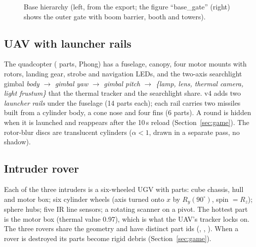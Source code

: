 \begin{figure}[h]
\centering
\begin{minipage}[t]{0.56\linewidth}\vspace{0pt}\end{minipage}\hfill
\begin{minipage}[t]{0.40\linewidth}\vspace{0pt}
\captionsetup{type=figure}
\end{minipage}
\caption{Base hierarchy (left, from the export; the figure ``base\_gate'' (right) shows the outer gate with boom
barrier, booth and towers).}
\end{figure}

\subsection{UAV with launcher rails}
The quadcopter (\partsUav{} parts, Phong) has a fuselage, canopy, four motor mounts with rotors, landing gear, strobe and
navigation LEDs, and the two-axis searchlight gimbal
\emph{body $\to$ gimbal yaw $\to$ gimbal pitch $\to$ \{lamp, lens, thermal camera, light frustum\}} that the thermal
tracker and the searchlight share. v4 adds two \emph{launcher rails} under the fuselage (14 parts each); each rail
carries two missiles built from a cylinder body, a cone nose and four fins (6 parts). A round is hidden when it is launched and
reappears after the 10\,s reload (Section~\ref{sec:game}). The rotor-blur discs are translucent cylinders
($\alpha<1$, drawn in a separate pass, no shadow).


\subsection{Intruder rover}
Each of the three intruders is a six-wheeled UGV with \partsRover{} parts: cube chassis, hull and motor box; six
cylinder wheels (axis turned onto $x$ by $R_y(90^\circ)$, spin $=R_z$); sphere hubs; five IR line sensors; a rotating
scanner on a pivot. The hottest part is the motor box (thermal value 0.97), which is what the UAV's tracker locks on.
The three rovers share the geometry and have distinct part ids (, , ).
When a rover is destroyed its parts become rigid debris (Section~\ref{sec:game}).


